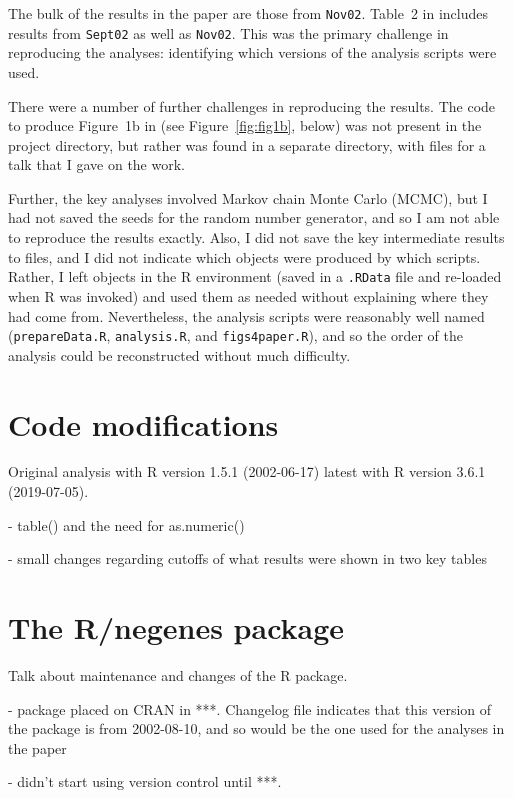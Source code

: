 The bulk of the results in the paper are those from \verb|Nov02|.
Table~2 in \citet{lamichhane2003} includes results from \verb|Sept02|
as well as \verb|Nov02|. This was the primary challenge in reproducing
the analyses: identifying which versions of the analysis
scripts were used.

There were a number of further challenges in reproducing the results.
The code to produce Figure~1b in \citet{lamichhane2003} (see
Figure~\ref{fig:fig1b}, below) was not
present in the project directory, but rather was found in a separate
directory, with files for a talk that I gave on the work.

Further, the key analyses involved Markov chain Monte Carlo (MCMC),
but I had not saved the seeds for the random number generator, and so
I am not able to reproduce the results exactly. Also, I did not save
the key intermediate results to files, and I did not indicate which
objects were produced by which scripts. Rather, I left objects in the
R environment (saved in a \verb|.RData| file and re-loaded when R was
invoked) and used them as needed without explaining where they had
come from. Nevertheless, the analysis scripts were reasonably well
named (\verb|prepareData.R|, \verb|analysis.R|,
and \verb|figs4paper.R|), and so the order of the analysis could be
reconstructed without much difficulty.

\section{Code modifications}

Original analysis with R version 1.5.1 (2002-06-17)
latest with R version 3.6.1 (2019-07-05).

- table() and the need for as.numeric()

- small changes regarding cutoffs of what results were shown in two
  key tables



\section{The R/negenes package}

Talk about maintenance and changes of the R package.

- package placed on CRAN in ***. Changelog file indicates that this
  version of the package is from 2002-08-10, and so would be the one
  used for the analyses in the paper

- didn't start using version control until ***.

